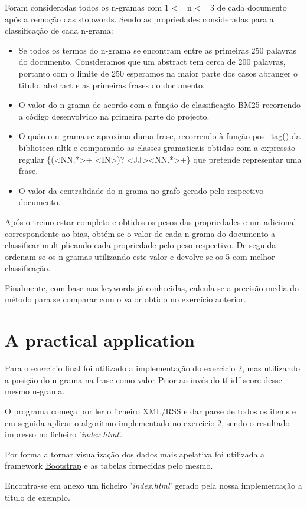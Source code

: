 \documentclass[a4paper,titlepage,11pt]{article}
\begin{document}
Foram consideradas todos os n-gramas com 1 \textless= n \textless= 3 de cada documento após a remoção das stopwords.
Sendo as propriedades consideradas para a classificação de cada n-grama:

\begin{itemize}
  \item Se todos os termos do n-grama se encontram entre as primeiras 250 palavras do documento.
  Consideramos que um abstract tem cerca de 200 palavras, portanto com o limite de 250 esperamos na
  maior parte dos casos abranger o titulo, abstract e as primeiras frases do documento.
  \item O valor do n-grama de acordo com a função de classificação BM25 recorrendo a código desenvolvido
  na primeira parte do projecto.
  \item O quão o n-grama se aproxima duma frase, recorrendo à função pos\_tag() da biblioteca nltk e comparando
  as classes gramaticais obtidas com a expressão regular
  \{(\textless{NN}.*\textgreater+ \textless{IN}\textgreater)? \textless{JJ}\textgreater* \textless{NN}.*\textgreater+\}
  que pretende representar uma frase.
  \item O valor da centralidade do n-grama no grafo gerado pelo respectivo documento.
\end{itemize}

Após o treino estar completo e obtidos os pesos das propriedades e um adicional correspondente ao bias,
obtém-se o valor de cada n-grama do documento a classificar multiplicando cada propriedade pelo peso
respectivo. De seguida ordenam-se os n-gramas utilizando este valor e devolve-se os 5 com melhor classificação.

Finalmente, com base nas keywords já conhecidas, calcula-se a precisão media do método para se comparar
com o valor obtido no exercício anterior.

\section{A practical application}
Para o exercicio final foi utilizado a implementação do exercicio 2, mas utilizando a posição do n-grama na frase
como valor Prior ao invés do tf-idf score desse mesmo n-grama.

O programa começa por ler o ficheiro XML/RSS e dar parse de todos os items e em seguida aplicar o algoritmo implementado
no exercicio 2, sendo o resultado impresso no ficheiro '\textit{index.html}'.

Por forma a tornar visualização dos dados mais apelativa foi utilizada a framework \href{http://getbootstrap.com/}{Bootstrap}
e as tabelas fornecidas pelo mesmo.

Encontra-se em anexo um ficheiro '\textit{index.html}' gerado pela nossa implementação a titulo de exemplo.
\end{document}
